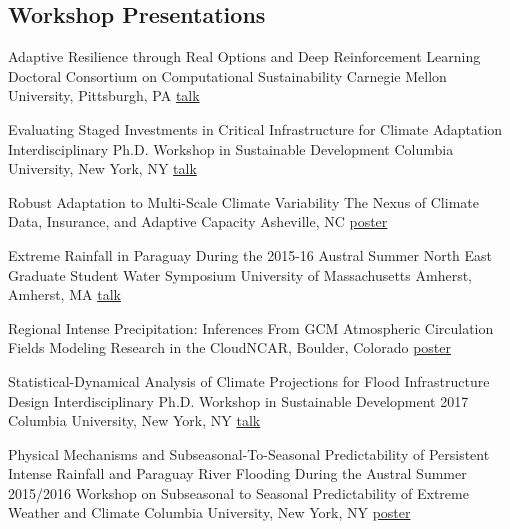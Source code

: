\subsection{Workshop Presentations}

{Adaptive Resilience through Real Options and Deep Reinforcement Learning}
{Doctoral Consortium on Computational Sustainability}
{Carnegie Mellon University, Pittsburgh, PA}
{\href{https://www.compsust.net/compsust-2019/}{talk}}
{}

{Evaluating Staged Investments in Critical Infrastructure for Climate Adaptation}
{Interdisciplinary Ph.D. Workshop in Sustainable Development}
{Columbia University, New York, NY}
{\href{https://doi.org/10.6084/m9.figshare.8277017.v1}{talk}}
{}

{Robust Adaptation to Multi-Scale Climate Variability}
{The Nexus of Climate Data, Insurance, and Adaptive Capacity}
{Asheville, NC}
{\href{https://doi.org/10.6084/m9.figshare.8277017.v1}{poster}}
{}

{Extreme Rainfall in Paraguay During the 2015-16 Austral Summer}
{North East Graduate Student Water Symposium}
{University of Massachusetts Amherst, Amherst, MA}
{\href{https://doi.org/10.6084/m9.figshare.8277167.v1}{talk}}
{}

{Regional Intense Precipitation:  Inferences From GCM Atmospheric Circulation Fields}
{Modeling Research in the Cloud}{NCAR, Boulder, Colorado}
{\href{https://doi.org/10.6084/m9.figshare.8277167.v1}{poster}}
{}

{Statistical-Dynamical Analysis of Climate Projections for Flood Infrastructure Design}
{Interdisciplinary Ph.D. Workshop in Sustainable Development 2017}
{Columbia University, New York, NY}
{\href{http://blogs.cuit.columbia.edu/sdds/ipwsd/interdisciplinary-ph-d-workshop-in-sustainable-development-2017/ipwsd-2017-schedule/}{talk}}
{}

{Physical Mechanisms and Subseasonal-To-Seasonal Predictability of Persistent Intense Rainfall and Paraguay River Flooding During the Austral Summer 2015/2016}
{Workshop on Subseasonal to Seasonal Predictability of Extreme Weather and Climate}
{Columbia University, New York, NY}
{\href{https://doi.org/10.13140/RG.2.2.24104.57607}{poster}}
{}
